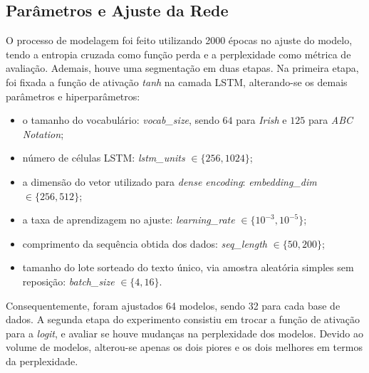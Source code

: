 \documentclass[twoside]{automatextcc}
\begin{document}
\subsection{Parâmetros e Ajuste da Rede}
O processo de modelagem foi feito utilizando 2000 épocas no ajuste do modelo, tendo a entropia cruzada como função perda e a perplexidade como métrica de avaliação. Ademais, houve uma segmentação em duas etapas. Na primeira etapa, foi fixada a função de ativação \textit{tanh} na camada LSTM, alterando-se os demais parâmetros e hiperparâmetros: 
\begin{itemize}
    \item o tamanho do vocabulário: \textit{vocab\_size}, sendo $64$ para \textit{Irish} e $125$ para \textit{ABC Notation};
    \item número de células LSTM: \textit{lstm\_units} $\in \{256,1024\}$;
    \item a dimensão do vetor utilizado para \textit{dense encoding}: \textit{embedding\_dim} $\in \{256,512\}$;
    \item a taxa de aprendizagem no ajuste: \textit{learning\_rate} $\in \{10^{-3},10^{-5}\}$;
    \item comprimento da sequência obtida dos dados: \textit{seq\_length} $\in \{50,200\}$;
    \item tamanho do lote sorteado do texto único, via amostra aleatória simples sem reposição: \textit{batch\_size} $\in \{4,16\}$.
\end{itemize}
Consequentemente, foram ajustados 64 modelos, sendo 32 para cada base de dados. A segunda etapa do experimento consistiu em trocar a função de ativação para a \textit{logit}, e avaliar se houve mudanças na perplexidade dos modelos. Devido ao volume de modelos, alterou-se apenas os dois piores e os dois melhores em termos da perplexidade.




\end{document}
